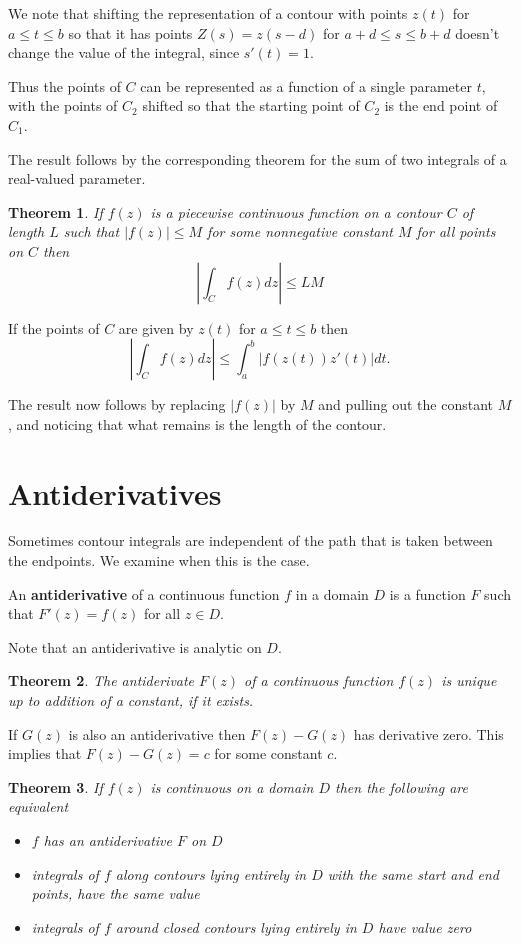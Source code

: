 \documentclass[a4paper,10pt]{article}
\newtheorem{theorem}{Theorem}[section]
\newenvironment{definition}[1][Definition]{\begin{trivlist}
\item[\hskip \labelsep {\bfseries #1}]}{\end{trivlist}}
\begin{document}
We note that shifting the representation of a contour with points $z(t)$ for $a \leq t \leq b$ so that it has points $Z(s) = z(s - d)$ for $a + d \leq s \leq b + d$ doesn't change the value of the integral, since $s'(t) = 1$.

Thus the points of $C$ can be represented as a function of a single parameter $t$, with the points of $C_2$ shifted so that the starting point of $C_2$ is the end point of $C_1$.

The result follows by the corresponding theorem for the sum of two integrals of a real-valued parameter.

\begin{theorem}
If $f(z)$ is a piecewise continuous function on a contour $C$ of length $L$ such that $|f(z)| \leq M$ for some nonnegative constant $M$ for all points on $C$ then
$$\left|\int_C f(z)dz\right| \leq LM$$
\end{theorem}

If the points of $C$ are given by $z(t)$ for $a \leq t \leq b$ then
$$\left|\int_C f(z)dz\right| \leq \int_a^b |f(z(t))z'(t)|dt.$$

The result now follows by replacing $|f(z)|$ by $M$ and pulling out the constant $M$, and noticing that what remains is the length of the contour.

\section{Antiderivatives}

Sometimes contour integrals are independent of the path that is taken between the endpoints. We examine when this is the case.

\begin{definition}
An \textbf{antiderivative} of a continuous function $f$ in a domain $D$ is a function $F$ such that $F'(z) = f(z)$ for all $z \in D$.
\end{definition}

Note that an antiderivative is analytic on $D$.

\begin{theorem}
The antiderivate $F(z)$ of a continuous function $f(z)$ is unique up to addition of a constant, if it exists.
\end{theorem}

If $G(z)$ is also an antiderivative then $F(z) - G(z)$ has derivative zero. This implies that $F(z) - G(z) = c$ for some constant $c$.

\begin{theorem}
If $f(z)$ is continuous on a domain $D$ then the following are equivalent
\begin{itemize}
\item $f$ has an antiderivative $F$ on $D$
\item integrals of $f$ along contours lying entirely in $D$ with the same start and end points, have the same value
\item integrals of $f$ around closed contours lying entirely in $D$ have value zero
\end{itemize}
\end{theorem}
\end{document}
